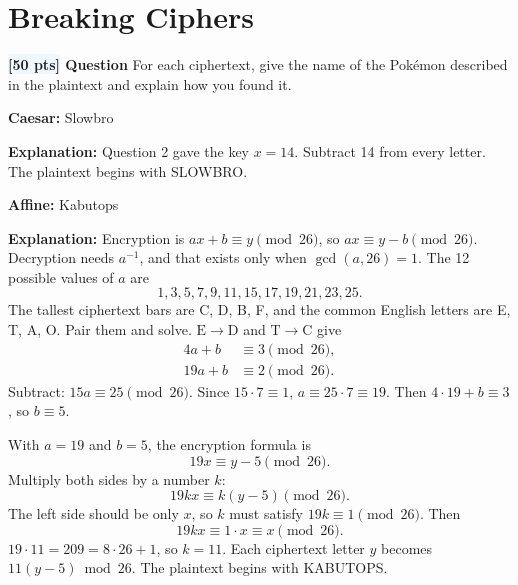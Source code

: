 \documentclass[12pt]{article}
\newcounter{question}
\newcommand{\question}[1]{\refstepcounter{question}%
  \textbf{\colorbox{aliceblue}{[#1 pts]} Question \arabic{question}}}
\begin{document}
\section{Breaking Ciphers}

\question{50} For each ciphertext, give the name of the Pok{\'e}mon described in the plaintext and explain how you found it.

\begin{answer}
    \textbf{Caesar:} Slowbro

    \textbf{Explanation:}
    Question 2 gave the key \(x = 14\). Subtract 14 from every letter. The plaintext begins with SLOWBRO.

    \smallskip
    {\scriptsize\ttfamily{}}

    \bigskip
    \textbf{Affine:} Kabutops

    \textbf{Explanation:}
    Encryption is \(ax+b\equiv y\pmod{26}\), so \(ax\equiv y-b\pmod{26}\). Decryption needs \(a^{-1}\), and that exists only when \(\gcd(a,26)=1\). The 12 possible values of \(a\) are
    \[
    1,3,5,7,9,11,15,17,19,21,23,25.
    \]
    The tallest ciphertext bars are C, D, B, F, and the common English letters are E, T, A, O. Pair them and solve. \(\mathrm{E}\to\mathrm{D}\) and \(\mathrm{T}\to\mathrm{C}\) give
    \begin{align*}
    4a+b &\equiv 3 \pmod{26},\\
    19a+b &\equiv 2 \pmod{26}.
    \end{align*}
    Subtract: \(15a\equiv 25\pmod{26}\). Since \(15\cdot 7\equiv 1\), \(a\equiv 25\cdot 7\equiv 19\). Then \(4\cdot 19+b\equiv 3\), so \(b\equiv 5\).

    With \(a=19\) and \(b=5\), the encryption formula is
    \[
    19x\equiv y-5\pmod{26}.
    \]
    Multiply both sides by a number \(k\):
    \[
    19kx\equiv k(y-5)\pmod{26}.
    \]
    The left side should be only \(x\), so \(k\) must satisfy \(19k\equiv 1\pmod{26}\). Then
    \[
    19kx\equiv 1\cdot x\equiv x\pmod{26}.
    \]
    \(19\cdot 11=209=8\cdot 26+1\), so \(k=11\). Each ciphertext letter \(y\) becomes \(11(y-5)\bmod 26\). The plaintext begins with KABUTOPS.

    \smallskip
    {\scriptsize\ttfamily{}}


\end{answer}
\end{document}
